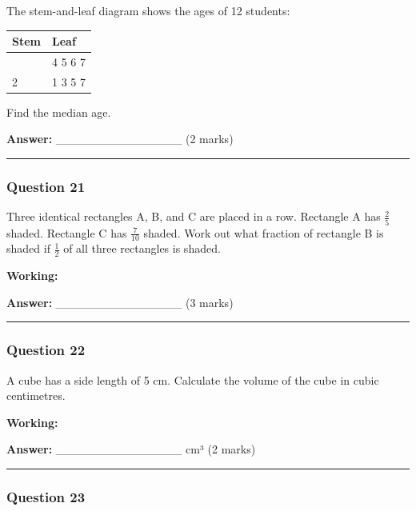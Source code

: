The stem-and-leaf diagram shows the ages of 12 students:

{\def\LTcaptype{none} %
\begin{longtable}[]{@{}ll@{}}
\toprule\noalign{}
Stem & Leaf \\
\midrule\noalign{}
\endhead
\bottomrule\noalign{}
\endlastfoot
1 & 4 5 6 7 \\
2 & 1 3 5 7 \\
\end{longtable}
}

Find the median age.

\textbf{Answer:} \_\_\_\_\_\_\_\_\_\_\_\_\_\_\_ (2 marks)

\begin{center}\rule{0.5\linewidth}{0.5pt}\end{center}

\subsubsection{Question 21}\label{question-21}

Three identical rectangles A, B, and C are placed in a row. Rectangle A
has \(\frac{2}{5}\) shaded. Rectangle C has \(\frac{7}{10}\) shaded.
Work out what fraction of rectangle B is shaded if \(\frac{1}{2}\) of
all three rectangles is shaded.

\textbf{Working:}

\textbf{Answer:} \_\_\_\_\_\_\_\_\_\_\_\_\_\_\_ (3 marks)

\begin{center}\rule{0.5\linewidth}{0.5pt}\end{center}

\subsubsection{Question 22}\label{question-22}

A cube has a side length of 5 cm. Calculate the volume of the cube in
cubic centimetres.

\textbf{Working:}

\textbf{Answer:} \_\_\_\_\_\_\_\_\_\_\_\_\_\_\_ cm³ (2 marks)

\begin{center}\rule{0.5\linewidth}{0.5pt}\end{center}

\subsubsection{Question 23}\label{question-23}

